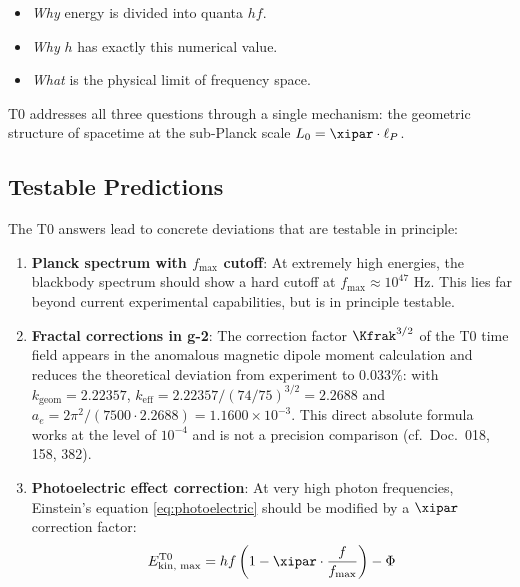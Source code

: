 \begin{itemize}
    \item \emph{Why} energy is divided into quanta $hf$.
    \item \emph{Why} $h$ has exactly this numerical value.
    \item \emph{What} is the physical limit of frequency space.
\end{itemize}

T0 addresses all three questions through a single mechanism: the geometric structure 
of spacetime at the sub-Planck scale $L_0 = \xipar \cdot \ell_P$.

\subsection{Testable Predictions}

The T0 answers lead to concrete deviations that are testable 
in principle:

\begin{enumerate}
    \item \textbf{Planck spectrum with $f_{\max}$ cutoff}: At extremely high energies, 
    the blackbody spectrum should show a hard cutoff at $f_{\max} \approx 10^{47}$ Hz. 
    This lies far beyond current experimental capabilities, but is in principle testable.
    
    \item \textbf{Fractal corrections in g-2}: The correction factor $\Kfrak^{3/2}$ 
    of the T0 time field appears in the anomalous magnetic dipole moment calculation 
    and reduces the theoretical deviation from experiment to $0.033\%$: with 
    $k_\text{geom} = 2.22357$, $k_\text{eff} = 2.22357/(74/75)^{3/2} = 2.2688$ and 
    $a_e = 2\pi^2/(7500 \cdot 2.2688) = 1.1600\times10^{-3}$. This direct absolute 
    formula works at the level of $10^{-4}$ and is not a precision comparison 
    (cf.\ Doc.~018, 158, 382).
    
    \item \textbf{Photoelectric effect correction}: At very high photon frequencies, 
    Einstein's equation \eqref{eq:photoelectric} should be modified by a $\xipar$ 
    correction factor:
    \begin{equation}
        E_{\text{kin, max}}^{\text{T0}} = hf\left(1 - \xipar \cdot \frac{f}{f_{\max}}\right) - \Phi
        \label{eq:photoelectric_t0}
    \end{equation}
\end{enumerate}

